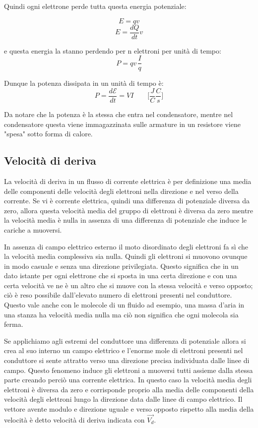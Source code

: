 Quindi ogni elettrone perde tutta questa energia potenziale:

\begin{equation*}
    E = qv
\end{equation*}
\begin{equation*}
    E = \frac{dQ}{dt}v
\end{equation*}

e questa energia la stanno perdendo per n elettroni per unità di tempo:
\begin{equation*}
    P = qv\,\frac{I}{q}
\end{equation*}

Dunque la potenza dissipata in un unità di tempo è:
\begin{equation}
    P = \frac{d\mathcal{E}}{dt} = V I\qquad\biggl[\frac{J}{C}\frac{C}{s}\biggl]
\end{equation}


Da notare che la potenza è la stessa che entra nel condensatore, mentre nel condensatore questa viene immagazzinata sulle armature in un resistore viene "spesa" sotto forma di calore.

\subsection{Velocità di deriva}
La velocità di deriva in un flusso di corrente elettrica è per definizione una media delle componenti delle velocità degli elettroni nella direzione e nel verso della corrente. Se vi è corrente elettrica, quindi una differenza di potenziale diversa da zero, allora questa velocità media del gruppo di elettroni è diversa da zero mentre la velocità media è nulla in assenza di una differenza di potenziale che induce le cariche a muoversi.

In assenza di campo elettrico esterno il moto disordinato degli elettroni fa sì che la velocità media complessiva sia nulla. Quindi gli elettroni si muovono ovunque in modo casuale e senza una direzione privilegiata. Questo significa che in un dato istante per ogni elettrone che si sposta in una certa direzione e con una certa velocità ve ne è un altro che si muove con la stessa velocità e verso opposto; ciò è reso possibile dall’elevato numero di elettroni presenti nel conduttore.
Questo vale anche con le molecole di un fluido ad esempio, una massa d'aria in una stanza ha velocità media nulla ma ciò non significa che ogni molecola sia ferma. 

Se applichiamo agli estremi del conduttore una differenza di potenziale allora si crea al suo interno un campo elettrico e l'enorme mole di elettroni presenti nel conduttore si sente attratto verso una direzione precisa individuata dalle linee di campo. Questo fenomeno induce gli elettroni a muoversi tutti assieme dalla stessa parte creando perciò una corrente elettrica. In questo caso la velocità media degli elettroni è diversa da zero e corrisponde proprio alla media delle componenti della velocità degli elettroni lungo la direzione data dalle linee di campo elettrico. 
Il vettore avente modulo e direzione uguale e verso opposto rispetto alla media della velocità è detto velocità di deriva indicata con $\Vec{V_d}$.

